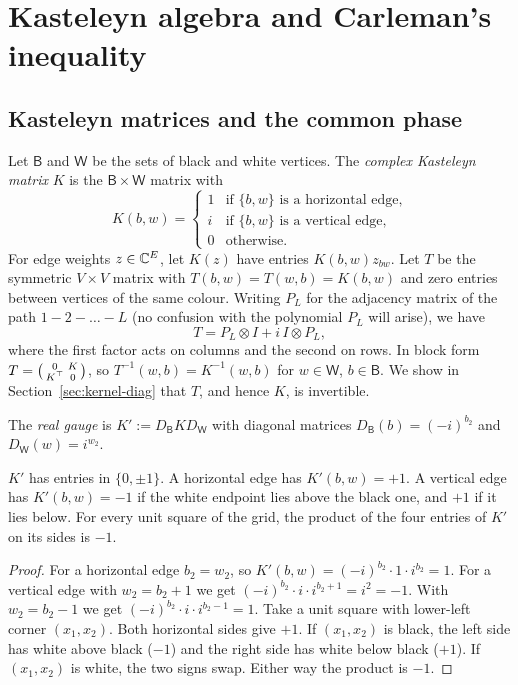 \section{Kasteleyn algebra and Carleman's inequality}\label{sec:kasteleyn}

\subsection{Kasteleyn matrices and the common phase}

Let $\mathsf B$ and $\mathsf W$ be the sets of black and white vertices. The \emph{complex Kasteleyn matrix} $K$ is the $\mathsf B\times\mathsf W$ matrix with
\[
  K(b,w)=\begin{cases}1 & \text{if $\{b,w\}$ is a horizontal edge,}\\ i & \text{if $\{b,w\}$ is a vertical edge,}\\ 0&\text{otherwise.}\end{cases}
\]
For edge weights $z\in\mathbb{C}^E$, let $K(z)$ have entries $K(b,w)z_{bw}$. Let $T$ be the symmetric $V\times V$ matrix with $T(b,w)=T(w,b)=K(b,w)$ and zero entries between vertices of the same colour. Writing $P_L$ for the adjacency matrix of the path $1-2-\dots-L$ (no confusion with the polynomial $P_L$ will arise), we have
\begin{equation}\label{eq:T-tensor}
  T=P_L\otimes I+i\,I\otimes P_L ,
\end{equation}
where the first factor acts on columns and the second on rows. In block form $T=\begin{psmallmatrix}0&K\\K^{\top}&0\end{psmallmatrix}$, so $T^{-1}(w,b)=K^{-1}(w,b)$ for $w\in\mathsf W$, $b\in\mathsf B$. We show in Section~\ref{sec:kernel-diag} that $T$, and hence $K$, is invertible.

The \emph{real gauge} is $K':=D_{\mathsf B}KD_{\mathsf W}$ with diagonal matrices $D_{\mathsf B}(b)=(-i)^{b_2}$ and $D_{\mathsf W}(w)=i^{w_2}$.

\begin{lemma}\label{lem:faces}
$K'$ has entries in $\{0,\pm1\}$. A horizontal edge has $K'(b,w)=+1$. A vertical edge has $K'(b,w)=-1$ if the white endpoint lies above the black one, and $+1$ if it lies below. For every unit square of the grid, the product of the four entries of $K'$ on its sides is $-1$.
\end{lemma}

\begin{proof}
For a horizontal edge $b_2=w_2$, so $K'(b,w)=(-i)^{b_2}\cdot1\cdot i^{b_2}=1$. For a vertical edge with $w_2=b_2+1$ we get $(-i)^{b_2}\cdot i\cdot i^{b_2+1}=i^2=-1$. With $w_2=b_2-1$ we get $(-i)^{b_2}\cdot i\cdot i^{b_2-1}=1$. Take a unit square with lower-left corner $(x_1,x_2)$. Both horizontal sides give $+1$. If $(x_1,x_2)$ is black, the left side has white above black ($-1$) and the right side has white below black ($+1$). If $(x_1,x_2)$ is white, the two signs swap. Either way the product is $-1$.
\end{proof}

